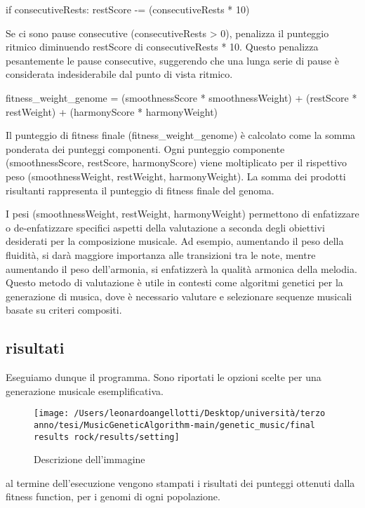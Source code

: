 \documentclass[a4paper,12pt]{report}
\begin{document}
if consecutiveRests:
    restScore -= (consecutiveRests * 10)

Se ci sono pause consecutive (consecutiveRests > 0), penalizza il punteggio ritmico diminuendo restScore di consecutiveRests * 10. 
Questo penalizza pesantemente le pause consecutive, suggerendo che una lunga serie di pause è considerata indesiderabile dal punto di vista ritmico.

fitness_weight_genome = (smoothnessScore * smoothnessWeight) + (restScore * restWeight) + (harmonyScore * harmonyWeight)

Il punteggio di fitness finale (fitness_weight_genome) è calcolato come la somma ponderata dei punteggi componenti.
Ogni punteggio componente (smoothnessScore, restScore, harmonyScore) viene moltiplicato per il rispettivo peso (smoothnessWeight, restWeight, harmonyWeight).
La somma dei prodotti risultanti rappresenta il punteggio di fitness finale del genoma.

I pesi (smoothnessWeight, restWeight, harmonyWeight) permettono di enfatizzare o de-enfatizzare specifici aspetti della valutazione a seconda degli obiettivi desiderati per la composizione musicale. 
Ad esempio, aumentando il peso della fluidità, si darà maggiore importanza alle transizioni tra le note, mentre aumentando il peso dell'armonia, si enfatizzerà la qualità armonica della melodia. 
Questo metodo di valutazione è utile in contesti come algoritmi genetici per la generazione di musica, dove è necessario valutare e selezionare sequenze musicali basate su criteri compositi.

\subsection{risultati}

Eseguiamo dunque il programma.
Sono riportati le opzioni scelte per una generazione musicale esemplificativa.

\begin{figure}[h!]
    \centering
    \texttt{[image: /Users/leonardoangellotti/Desktop/università/terzo anno/tesi/MusicGeneticAlgorithm-main/genetic\_music/final results rock/results/setting]} 
    \caption{Descrizione dell'immagine}
    \label{fig:immagine}
\end{figure}

al termine dell'esecuzione vengono stampati i risultati dei punteggi ottenuti dalla fitness function, per i genomi di ogni popolazione.
\end{document}

